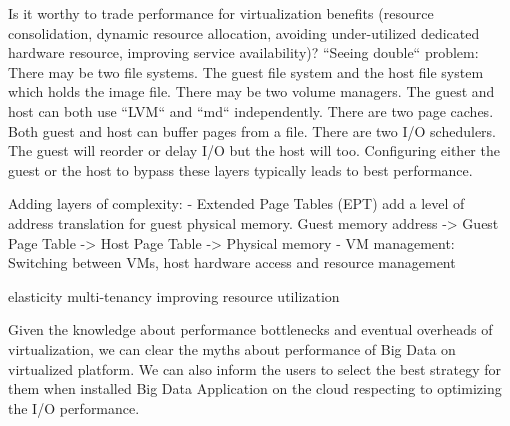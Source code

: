 \documentclass{acmsig}
\begin{document}
Is it worthy to trade performance for virtualization benefits (resource consolidation, dynamic resource allocation, avoiding under-utilized dedicated hardware resource, improving service availability)?
``Seeing double`` problem: There may be two file systems. The guest file system and the host file system which holds the image file. There may be two volume managers. The guest and host can both use ``LVM`` and ``md`` independently. There are two page caches. Both guest and host can buffer pages from a file. There are two I/O schedulers. The guest will reorder or delay I/O but the host will too. Configuring either the guest or the host to bypass these layers typically leads to best performance.

Adding layers of complexity: 
- Extended Page Tables (EPT) add a level of address translation for guest physical memory. Guest memory address -> Guest Page Table -> Host Page Table -> Physical memory
- VM management: Switching between VMs, host hardware access and resource management  

elasticity
multi-tenancy
improving resource utilization

Given the knowledge about performance bottlenecks and eventual overheads of virtualization, we can clear the myths about performance of Big Data on virtualized platform. We can also inform the users to select the best strategy for them when installed Big Data Application on the cloud respecting to optimizing the I/O performance.

\end{document}

